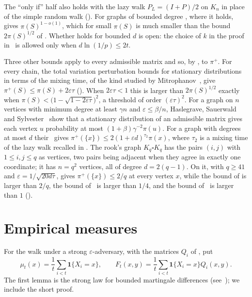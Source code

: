 \documentclass[11pt]{article}
\theoremstyle{remark}
\theoremstyle{plain}
\begin{document}
The ``only if'' half also holds with the lazy walk $P_L=(I+P)/2$ on $K_n$ in place of the simple random walk
().
For graphs of bounded degree , where it holds, gives $\pi(S)^{1-o(1)}$, which for small $\pi(S)$ is
much smaller than the bound $2\pi(S)^{1/2}$ of . Whether  holds for bounded $d$ is open: the choice of $k$ in the proof in~\cite{Zu} is
allowed only when $d\ln(1/p)\le2t$.

Three other bounds apply to every admissible matrix and so, by , to $\pi^+$. For every chain, the
total variation perturbation bounds for stationary distributions in terms of the mixing time, of the kind studied by
Mitrophanov~\cite{Mi}, give $\pi^+(S)\le\pi(S)+2\varepsilon\tau$ (). When $2\varepsilon\tau<1$ this is
larger than $2\pi(S)^{1/2}$ exactly when $\pi(S)<\bigl(1-\sqrt{1-2\varepsilon\tau}\bigr)^2$, a threshold of order
$(\varepsilon\tau)^2$. For a graph on $n$ vertices with minimum degree at least $\gamma n$ and $\varepsilon\le\beta/n$,
Haslegrave, Sauerwald and Sylvester~\cite[Proposition~4.7]{HSS} show that a stationary distribution of an admissible
matrix gives each vertex $u$ probability at most $(1+\beta)\gamma^{-2}\pi(u)$. For a graph with degrees at most $d$ their~\cite[Proposition~4.8]{HSS} gives
$\pi^+(\{x\})\le2(1+\varepsilon d)^{\tau_2}\pi(x)$, where $\tau_2$ is a mixing time of the lazy walk recalled in
. The rook's graph $K_q\square K_q$ has the pairs $(i,j)$ with $1\le i,j\le q$ as vertices, two pairs
being adjacent when they agree in exactly one coordinate; it has $n=q^2$ vertices, all of degree $d=2(q-1)$. On it,
with $q\ge41$ and $\varepsilon=1/\sqrt{20d\tau}$,  gives $\pi^+(\{x\})\le2/q$ at every vertex $x$, while
the bound of  is larger than $2/q$, the bound of~\cite[Proposition~4.7]{HSS} is larger than $1/4$, and
the bound of~\cite[Proposition~4.8]{HSS} is larger than $1$ ().

\section{Empirical measures}\label{sec:emp}

For the walk under a strong $\varepsilon$-adversary, with the matrices $Q_i$ of , put
\[
\mu_t(x)=\frac1t\sum_{i<t}\mathbf 1\{X_i=x\},\qquad F_t(x,y)=\frac1t\sum_{i<t}\mathbf 1\{X_i=x\}Q_i(x,y).
\]
The first lemma is the strong law for bounded martingale differences (see~\cite[Chapter~2]{HH}); we include the
short proof.
\end{document}
